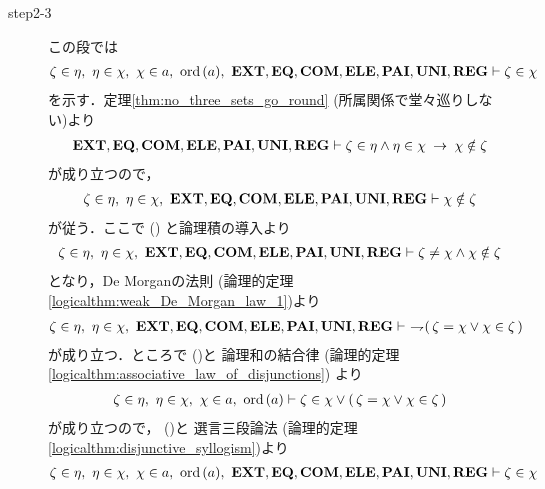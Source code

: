 \begin{sketch}
\begin{description}
\begin{description}
					\item[step2-3] この段では
						\begin{align}
							\zeta \in \eta,\ \eta \in \chi,\ \chi \in a,\ \ord{a},\ 
							\EXTAX,\EQAX,\COMAX,\ELEAX,\PAIAX,\UNIAX,\REGAX \vdash 
							\zeta \in \chi
						\end{align}
						を示す．定理\ref{thm:no_three_sets_go_round}
						(所属関係で堂々巡りしない)より
						\begin{align}
							\mbox{{\bf EXT}},\mbox{{\bf EQ}},\mbox{\bf COM},\mbox{{\bf ELE}},\mbox{{\bf PAI}},\mbox{{\bf UNI}},\mbox{{\bf REG}} \vdash 
							\zeta \in \eta \wedge \eta \in \chi \hspace{0.25em}\rightarrow\hspace{0.25em} 
							\chi \notin \zeta
						\end{align}
						が成り立つので，
						\begin{align}
							\zeta \in \eta,\ \eta \in \chi,\ 
							\EXTAX,\EQAX,\COMAX,\ELEAX,\PAIAX,\UNIAX,\REGAX \vdash 
							\chi \notin \zeta
						\end{align}
						が従う．ここで
						()
						と論理積の導入より
						\begin{align}
							\zeta \in \eta,\ \eta \in \chi,\ 
							\EXTAX,\EQAX,\COMAX,\ELEAX,\PAIAX,\UNIAX,\REGAX \vdash 
							\zeta \neq \chi \wedge \chi \notin \zeta
						\end{align}
						となり，De Morganの法則
						(論理的定理\ref{logicalthm:weak_De_Morgan_law_1})より
						\begin{align}
							\zeta \in \eta,\ \eta \in \chi,\ 
							\EXTAX,\EQAX,\COMAX,\ELEAX,\PAIAX,\UNIAX,\REGAX \vdash\ 
							\negation (\, \zeta = \chi \vee \chi \in \zeta\, )
							\label{fom:thm_transitive_totally_ordered_class_7}
						\end{align}
						が成り立つ．ところで
						()と
						論理和の結合律
						(論理的定理\ref{logicalthm:associative_law_of_disjunctions})
						より
						\begin{align}
							\zeta \in \eta,\ \eta \in \chi,\ \chi \in a,\ \operatorname*{ord}\hspace{0.15em}(a) 
							\vdash 
							\zeta \in \chi \vee (\, \zeta = \chi \vee \chi \in \zeta\, )
						\end{align}
						が成り立つので，
						()と
						選言三段論法
						(論理的定理\ref{logicalthm:disjunctive_syllogism})より
						\begin{align}
							\zeta \in \eta,\ \eta \in \chi,\ \chi \in a,\ \ord{a},\ 
							\EXTAX,\EQAX,\COMAX,\ELEAX,\PAIAX,\UNIAX,\REGAX \vdash 
							\zeta \in \chi
							\label{fom:thm_transitive_totally_ordered_class_8}

\end{align}
\end{description}
\end{description}
\end{sketch}
